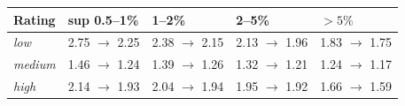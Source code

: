 \begin{tabular}{@{}lllll@{}}
\toprule
Rating & sup 0.5--1\% & 1--2\% & 2--5\% & $>5\%$ \\
\midrule
\emph{low} & 2.75 $\to$ 2.25 & 2.38 $\to$ 2.15 & 2.13 $\to$ 1.96 & 1.83 $\to$ 1.75 \\
\emph{medium} & 1.46 $\to$ 1.24 & 1.39 $\to$ 1.26 & 1.32 $\to$ 1.21 & 1.24 $\to$ 1.17 \\
\emph{high} & 2.14 $\to$ 1.93 & 2.04 $\to$ 1.94 & 1.95 $\to$ 1.92 & 1.66 $\to$ 1.59 \\
\bottomrule
\end{tabular}
